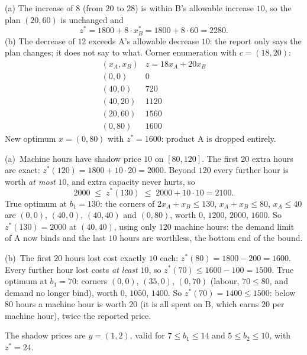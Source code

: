 \begin{solutions}
  \item (a) The increase of $8$ (from $20$ to $28$) is within B's
        allowable increase $10$, so the plan $(20,60)$ is unchanged and
        \[
          z^{*}=1800+8\cdot x_{B}^{*}=1800+8\cdot 60=2280 .
        \]
        (b) The decrease of $12$ exceeds A's allowable decrease $10$:
        the report only says the plan changes; it does not say to what.
        Corner enumeration with $c=(18,20)$:
        \[
          \begin{array}{c|c}
            (x_{A},x_{B}) & z=18x_{A}+20x_{B}\\\hline
            (0,0) & 0\\
            (40,0) & 720\\
            (40,20) & 1120\\
            (20,60) & 1560\\
            (0,80) & 1600
          \end{array}
        \]
        New optimum $x=(0,80)$ with $z^{*}=1600$: product A is dropped
        entirely.

  \item (a)~Machine hours have shadow price $10$ on $[80,120]$. The first
        $20$ extra hours are exact: $z^{*}(120)=1800+10\cdot20=2000$.
        Beyond $120$ every further hour is worth \emph{at most} $10$, and
        extra capacity never hurts, so
        \[
          2000\;\le\; z^{*}(130)\;\le\; 2000+10\cdot 10=2100 .
        \]
        True optimum at $b_{1}=130$: the corners of $2x_{A}+x_{B}\le 130$,
        $x_{A}+x_{B}\le 80$, $x_{A}\le 40$ are $(0,0)$, $(40,0)$, $(40,40)$
        and $(0,80)$, worth $0$, $1200$, $2000$, $1600$. So
        $z^{*}(130)=2000$ at $(40,40)$, using only $120$ machine hours: the
        demand limit of A now binds and the last $10$ hours are worthless,
        the bottom end of the bound.

        (b)~The first $20$ hours lost cost exactly $10$ each:
        $z^{*}(80)=1800-200=1600$. Every further hour lost costs
        \emph{at least} $10$, so $z^{*}(70)\le 1600-100=1500$. True
        optimum at $b_{1}=70$: corners $(0,0)$, $(35,0)$, $(0,70)$ (labour,
        $70\le 80$, and demand no longer bind), worth $0$, $1050$, $1400$.
        So $z^{*}(70)=1400\le 1500$: below $80$ hours a machine hour is
        worth $20$ (it is all spent on B, which earns $20$ per machine
        hour), twice the reported price.

  \item The shadow prices are $y=(1,2)$, valid for $7\le b_{1}\le 14$ and
        $5\le b_{2}\le 10$, with $z^{*}=24$.


\end{solutions}
